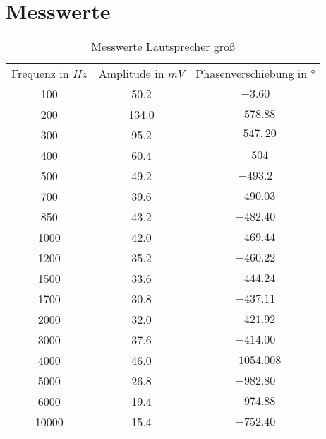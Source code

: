 \section{Messwerte}
\begin{table}[H]
\centering
\begin{tabular}{ccc}
  Frequenz in $Hz$ & Amplitude in $mV$ &  Phasenverschiebung in $°$ \\
  100 & 50.2 & $-3.60$ \\
  200 & 134.0 & $-578.88$ \\
  300 & 95.2 & $-547,20$ \\
  400 & 60.4 & $-504$ \\
  500 & 49.2 & $-493.2$ \\
  700 & 39.6 & $-490.03$ \\
  850 & 43.2 & $-482.40$ \\
  1000 & 42.0 & $-469.44$ \\
  1200 & 35.2 & $-460.22$ \\
  1500 & 33.6 & $-444.24$ \\
  1700 & 30.8 & $-437.11$ \\
  2000 & 32.0 & $-421.92$ \\
  3000 & 37.6 & $-414.00$ \\
  4000 & 46.0 & $-1054.008$ \\
  5000 & 26.8 & $-982.80$ \\
  6000 & 19.4 & $-974.88$ \\
  10000 & 15.4 & $-752.40$ \\
 \end{tabular}
\label{tab:MLg}
\caption{Messwerte Lautsprecher groß}
\end{table}

